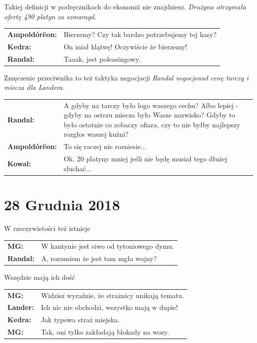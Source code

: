 \documentclass[10pt,twoside,twocolumn]{book}
\begin{document}
\begin{rpg-quotebox}{Takiej definicji w podręcznikach do ekonomii nie znajdziesz.}
   \textit{Drużyna otrzymała ofertę 490 platyn za szmaragd.}\\

   \begin{tabularx}{\columnwidth}{lX}
      \textbf{Ampoldórëon:} & Bierzemy? Czy tak bardzo potrzebujemy tej kasy?\\
      \textbf{Kedra:} & On miał klątwę! Oczywiście że bierzemy!\\
      \textbf{Randal:} & Taaak, jest poleasingowy.\\
   \end{tabularx}
\end{rpg-quotebox}


\begin{rpg-quotebox}{Zmęczenie przeciwnika to też taktyka negocjacji}
   \textit{Randal negocjował cenę tarczy i miecza dla Landera.}\\

   \begin{tabularx}{\columnwidth}{lX}
      \textbf{Randal:} & A gdyby na tarczy było logo waszego cechu? Albo lepiej - gdyby na ostrzu miecza było Wasze nazwisko? Gdyby to było ostatnie co zobaczy ofiara, czy to nie byłby najlepszy rozgłos waszej kuźni?\\
      \textbf{Ampoldórëon:} & To się raczej nie rozniesie...\\
      \textbf{Kowal:} & Ok. 20 platyny mniej jeśli nie będę musiał tego dłużej słuchać...\\
   \end{tabularx}
\end{rpg-quotebox}


\section*{28 Grudnia 2018}

\begin{rpg-quotebox}{W rzeczywistości też istnieje}
   \begin{tabularx}{\columnwidth}{lX}
      \textbf{MG:} & W kantynie jest siwo od tytoniowego dymu.\\
      \textbf{Randal:} & A, rozumiem że jest tam mgła wojny?\\
   \end{tabularx}
\end{rpg-quotebox}


\begin{rpg-quotebox}{Wszędzie mają ich dość}
   \begin{tabularx}{\columnwidth}{lX}
      \textbf{MG:} & Widzisz wyraźnie, że strażnicy unikają tematu.\\
      \textbf{Lander:} & Ich nic nie obchodzi, wszystko mają w dupie!\\
      \textbf{Kedra:} & Jak typowa straż miejska.\\
      \textbf{MG:} & Tak, oni tylko zakładają blokady na wozy.\\
   \end{tabularx}
\end{rpg-quotebox}
\end{document}

